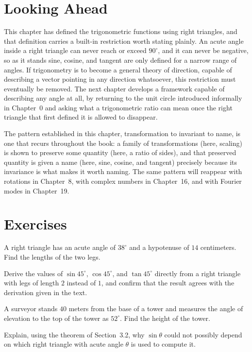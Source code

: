 \section{Looking Ahead}

This chapter has defined the trigonometric functions using right triangles,
and that definition carries a built-in restriction worth stating plainly.
An acute angle inside a right triangle can never reach or exceed $90^\circ$,
and it can never be negative, so as it stands sine, cosine, and tangent are
only defined for a narrow range of angles. If trigonometry is to become a
general theory of direction, capable of describing a vector pointing in any
direction whatsoever, this restriction must eventually be removed. The next
chapter develops a framework capable of describing any angle at all, by
returning to the unit circle introduced informally in Chapter~0 and asking
what a trigonometric ratio can mean once the right triangle that first
defined it is allowed to disappear.

The pattern established in this chapter, transformation to invariant to
name, is one that recurs throughout the book: a family of transformations
(here, scaling) is shown to preserve some quantity (here, a ratio of sides),
and that preserved quantity is given a name (here, sine, cosine, and
tangent) precisely because its invariance is what makes it worth naming.
The same pattern will reappear with rotations in Chapter~8, with complex
numbers in Chapter~16, and with Fourier modes in Chapter~19.

\section{Exercises}
\begin{exercise}
A right triangle has an acute angle of $38^\circ$ and a hypotenuse of $14$
centimeters. Find the lengths of the two legs.
\end{exercise}

\begin{exercise}
Derive the values of $\sin 45^\circ$, $\cos 45^\circ$, and $\tan 45^\circ$
directly from a right triangle with legs of length $2$ instead of $1$, and
confirm that the result agrees with the derivation given in the text.
\end{exercise}

\begin{exercise}
A surveyor stands $40$ meters from the base of a tower and measures the
angle of elevation to the top of the tower as $52^\circ$. Find the height
of the tower.
\end{exercise}

\begin{exercise}
Explain, using the theorem of Section~3.2, why $\sin\theta$ could not
possibly depend on which right triangle with acute angle $\theta$ is used to
compute it.
\end{exercise}
